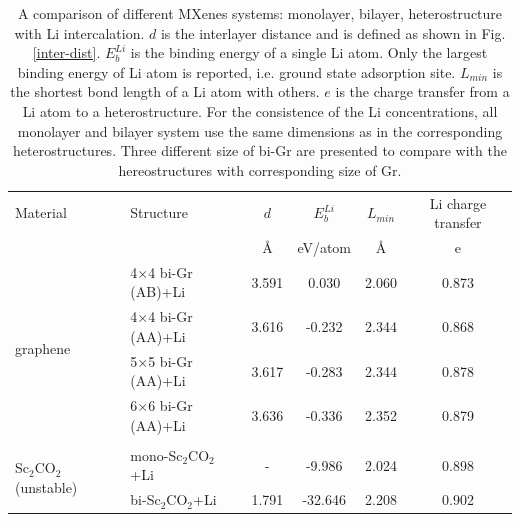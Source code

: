 \begin{table}[htbp]
{\footnotesize
\centering
\caption{A comparison of different MXenes systems: monolayer, bilayer, heterostructure with Li intercalation. $d$ is the interlayer distance and is defined as shown in Fig. \ref{inter-dist}. $E_b^{Li}$ is the binding energy of a single Li atom. Only the largest binding energy of Li atom is reported, i.e. ground state adsorption site. $L_{min}$ is the shortest bond length of a Li atom with others. $e$ is the charge transfer from a Li atom to a heterostructure. For the consistence of the Li concentrations, all monolayer and bilayer system use the same dimensions as in the corresponding heterostructures. Three different size of bi-Gr are presented to compare with the hereostructures with corresponding size of Gr.} 
\label{my-label}
\begin{tabularx}{\textwidth}{llcccc}
\hline
Material      & Structure                         & $d$                & $E_b^{Li}$               & $L_{min}$ & Li charge transfer   \\
              &                                   & \AA                       & eV/atom                             & \AA                       & e                \\ \hline
\multirow{4}{*}{graphene}      & 4$\times$4 bi-Gr (AB)+Li                 & 3.591                    & 0.030                          & 2.060                     & 0.873                        \\
              & 4$\times$4 bi-Gr (AA)+Li                 & 3.616                                                                            & -0.232                         & 2.344                     & 0.868                        \\
              & 5$\times$5 bi-Gr (AA)+Li                  & 3.617                                                                          & -0.283                         & 2.344                     & 0.878                        \\
              & 6$\times$6 bi-Gr (AA)+Li                  & 3.636                                                                         & -0.336                         & 2.352                     & 0.879                        \\ 
& & & & \\              
\multirow{3}{*}{Sc$_2$CO$_2$ (unstable)}    & mono-Sc$_2$CO$_2$+Li  & -  & -9.986  & 2.024  & 0.898 \\
              & bi-Sc$_2$CO$_2$+Li   & 1.791              & -32.646 & 2.208  & 0.902 \\

\end{tabularx}}
\end{table}
